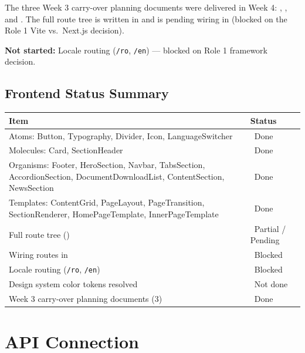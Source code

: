 \documentclass[12pt,a4paper]{article}
\newcommand{\done}{\textcolor{statusGreen}{\faCheckCircle\ Done}}
\newcommand{\warn}{\textcolor{statusAmber}{\faExclamationTriangle\ Partial / Pending}}
\newcommand{\missing}{\textcolor{statusRed}{\faTimes\ Not done}}
\newcommand{\blocked}{\textcolor{statusRed}{\faBan\ Blocked}}
\begin{document}
\vspace{0.5em}

The three Week 3 carry-over planning documents were delivered in Week 4:
, , and
. The full route tree is written in
 and is pending wiring in 
(blocked on the Role 1 Vite vs.\ Next.js decision).

\vspace{0.6em}
\textbf{Not started:} Locale routing (\texttt{/ro}, \texttt{/en}) ---
blocked on Role 1 framework decision.

\subsection{Frontend Status Summary}

\begin{longtable}{@{}L{9.5cm}L{3.7cm}@{}}
\toprule
{}
\textbf{Item} & \textbf{Status} \\
\midrule
\endhead
Atoms: Button, Typography, Divider, Icon, LanguageSwitcher & \done \\
\addlinespace
Molecules: Card, SectionHeader & \done \\
\addlinespace
Organisms: Footer, HeroSection, Navbar, TabsSection, AccordionSection,
  DocumentDownloadList, ContentSection, NewsSection & \done \\
\addlinespace
Templates: ContentGrid, PageLayout, PageTransition, SectionRenderer,
  HomePageTemplate, InnerPageTemplate & \done \\
\addlinespace
Full route tree () & \warn \\
\addlinespace
Wiring routes in  & \blocked \\
\addlinespace
Locale routing (\texttt{/ro}, \texttt{/en}) & \blocked \\
\addlinespace
Design system color tokens resolved & \missing \\
\addlinespace
Week 3 carry-over planning documents (3) & \done \\
\bottomrule
\end{longtable}

\newpage

\section{API Connection}
\end{document}
